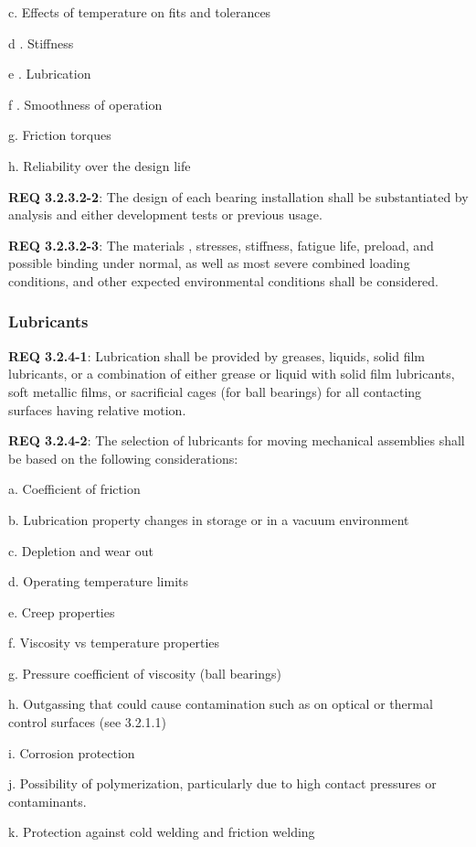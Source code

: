 \documentclass[12pt]{article}
\begin{document}
c. Effects of temperature on fits and tolerances

d . Stiffness

e . Lubrication

f . Smoothness of operation

g. Friction torques

h. Reliability over the design life

\noindent \textbf{REQ 3.2.3.2-2}: The design of each bearing installation shall be substantiated by analysis and either development tests or previous usage. 

\noindent \textbf{REQ 3.2.3.2-3}: The materials , stresses, stiffness, fatigue life, preload, and possible binding under normal, as well as most severe combined loading conditions, and other expected environmental conditions shall be considered.


\clearpage
\subsubsection{Lubricants} %
\noindent \textbf{REQ 3.2.4-1}: Lubrication shall be provided by greases, liquids, solid film lubricants, or a combination of either grease or liquid with solid film lubricants, soft metallic films, or sacrificial cages (for ball bearings) for all contacting surfaces having relative motion. 

\noindent \textbf{REQ 3.2.4-2}: The selection of lubricants for moving mechanical assemblies shall be based on the following considerations:

a. Coefficient of friction

b. Lubrication property changes in storage or in a vacuum environment

c. Depletion and wear out

d. Operating temperature limits

e. Creep properties

f. Viscosity vs temperature properties

g. Pressure coefficient of viscosity (ball bearings)

h. Outgassing that could cause contamination such as on optical or thermal control surfaces (see 3.2.1.1)

i. Corrosion protection

j. Possibility of polymerization, particularly due to high contact pressures or contaminants.

k. Protection against cold welding and friction welding
\end{document}
